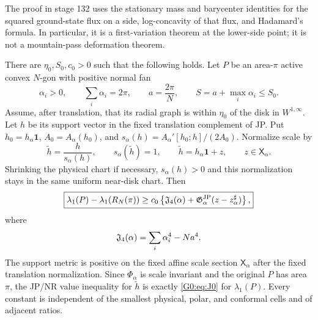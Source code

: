 The proof in stage 132 uses the stationary mass and barycenter identities
for the squared ground-state flux on a side, log-concavity of that flux,
and Hadamard's formula.  In particular, it is a first-variation theorem at
the lower-side point; it is not a mountain-pass deformation theorem.

\begin{obligation}
\label{G0:thm:J0}
There are $\eta_0,S_0,c_0>0$ such that the following holds.  Let $P$ be an
area-$\pi$ active convex $N$-gon with positive normal fan
\begin{equation*}
 \alpha_i>0,\qquad \sum_i\alpha_i=2\pi,\qquad
 a=\frac{2\pi}{N},\qquad S=a+\max_i\alpha_i\le S_0.
\end{equation*}
Assume, after translation, that its radial graph is within $\eta_0$ of
the disk in $W^{1,\infty}$.  Let $h$ be its support vector in the fixed
translation complement of JP.  Put $h_0=h_\alpha\mathbf1$,
$A_0=A_\alpha(h_0)$, and
\(
s_\alpha(h)=A_\alpha'[h_0;h]/(2A_0).
\)
Normalize scale by
\[
 \widetilde h=\frac{h}{s_\alpha(h)},
 \qquad s_\alpha(\widetilde h)=1,
 \qquad \widetilde h=h_\alpha\mathbf1+z,
 \qquad z\in\mathsf X_\alpha.
\]
Shrinking the physical chart if necessary, $s_\alpha(h)>0$ and this
normalization stays in the same uniform near-disk chart.  Then
\begin{equation}\label{G0:eq:J0}
 \boxed{
 \lambda_1(P)-\lambda_1(R_N(\pi))
 \ge c_0\left\{
 \mathfrak J_4(\alpha)
 +\mathfrak G^{\rm JP}_\alpha(z-z_\alpha^\sharp)\right\},}
\end{equation}
where
\begin{equation}\label{G0:eq:J4}
 \mathfrak J_4(\alpha)=\sum_i\alpha_i^4-Na^4.
\end{equation}
The support metric is positive on the fixed affine scale section
$\mathsf X_\alpha$ after the fixed translation normalization.  Since
$\Phi_\alpha$ is scale invariant and the original $P$ has area $\pi$,
the JP/NR value inequality for $\widetilde h$ is exactly
\eqref{G0:eq:J0} for $\lambda_1(P)$.
Every constant is independent of the smallest physical, polar, and
conformal cells and of adjacent ratios.
\end{obligation}

